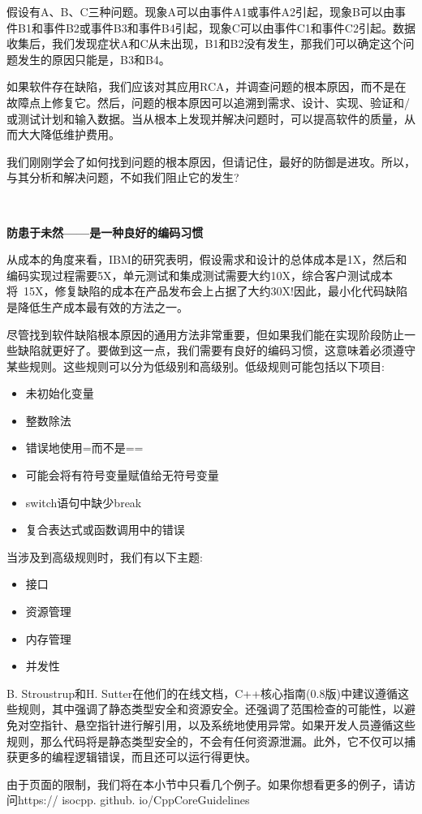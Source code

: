 假设有A、B、C三种问题。现象A可以由事件A1或事件A2引起，现象B可以由事件B1和事件B2或事件B3和事件B4引起，现象C可以由事件C1和事件C2引起。数据收集后，我们发现症状A和C从未出现，B1和B2没有发生，那我们可以确定这个问题发生的原因只能是，B3和B4。 \par
如果软件存在缺陷，我们应该对其应用RCA，并调查问题的根本原因，而不是在故障点上修复它。然后，问题的根本原因可以追溯到需求、设计、实现、验证和/或测试计划和输入数据。当从根本上发现并解决问题时，可以提高软件的质量，从而大大降低维护费用。 \par
我们刚刚学会了如何找到问题的根本原因，但请记住，最好的防御是进攻。所以，与其分析和解决问题，不如我们阻止它的发生? \par

\noindent\textbf{}\ \par
\textbf{防患于未然——是一种良好的编码习惯} \ \par
从成本的角度来看，IBM的研究表明，假设需求和设计的总体成本是1X，然后和编码实现过程需要5X，单元测试和集成测试需要大约10X，综合客户测试成本将~15X，修复缺陷的成本在产品发布会上占据了大约30X!因此，最小化代码缺陷是降低生产成本最有效的方法之一。 \par
尽管找到软件缺陷根本原因的通用方法非常重要，但如果我们能在实现阶段防止一些缺陷就更好了。要做到这一点，我们需要有良好的编码习惯，这意味着必须遵守某些规则。这些规则可以分为低级别和高级别。低级规则可能包括以下项目: \par

\begin{itemize}
	\item 未初始化变量
	\item 整数除法
	\item 错误地使用=而不是==
	\item 可能会将有符号变量赋值给无符号变量
	\item switch语句中缺少break
	\item 复合表达式或函数调用中的错误
\end{itemize}

当涉及到高级规则时，我们有以下主题: \par

\begin{itemize}
	\item 接口
	\item 资源管理
	\item 内存管理
	\item 并发性
\end{itemize}

B. Stroustrup和H. Sutter在他们的在线文档，C++核心指南(0.8版)中建议遵循这些规则，其中强调了静态类型安全和资源安全。还强调了范围检查的可能性，以避免对空指针、悬空指针进行解引用，以及系统地使用异常。如果开发人员遵循这些规则，那么代码将是静态类型安全的，不会有任何资源泄漏。此外，它不仅可以捕获更多的编程逻辑错误，而且还可以运行得更快。 \par
由于页面的限制，我们将在本小节中只看几个例子。如果你想看更多的例子，请访问https:// isocpp. github. io/CppCoreGuidelines \par

